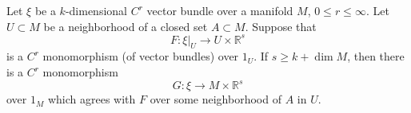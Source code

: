 Let $\xi$ be a $k$-dimensional $C^r$ vector bundle over a manifold $M$, $0 \leqslant r \leqslant \infty$. Let $U \subset M$ be a neighborhood of a closed set $A \subset M$. Suppose that
$$F: \xi|_U \to U \times \mathbb{R}^s$$
is a $C^r$ monomorphism (of vector bundles) over $1_U$. If $s \geqslant k + \dim M$, then there is a $C^r$ monomorphism
$$G: \xi \to M \times \mathbb{R}^s$$
over $1_M$ which agrees with $F$ over some neighborhood of $A$ in $U$.
